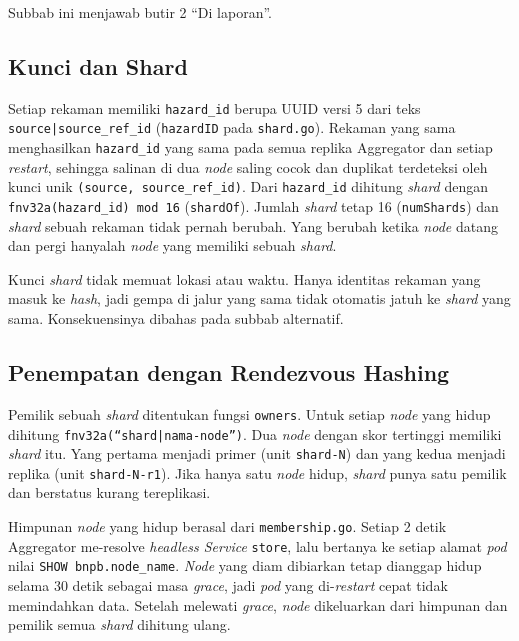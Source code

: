 Subbab ini menjawab butir 2 ``Di laporan''.

\subsection{Kunci dan Shard}

Setiap rekaman memiliki \texttt{hazard\_id} berupa UUID versi 5 dari teks \texttt{source|source\_ref\_id} (\texttt{hazardID} pada \texttt{shard.go}). Rekaman yang sama menghasilkan \texttt{hazard\_id} yang sama pada semua replika Aggregator dan setiap \textit{restart}, sehingga salinan di dua \textit{node} saling cocok dan duplikat terdeteksi oleh kunci unik \texttt{(source, source\_ref\_id)}. Dari \texttt{hazard\_id} dihitung \textit{shard} dengan \texttt{fnv32a(hazard\_id) mod 16} (\texttt{shardOf}). Jumlah \textit{shard} tetap 16 (\texttt{numShards}) dan \textit{shard} sebuah rekaman tidak pernah berubah. Yang berubah ketika \textit{node} datang dan pergi hanyalah \textit{node} yang memiliki sebuah \textit{shard}.

Kunci \textit{shard} tidak memuat lokasi atau waktu. Hanya identitas rekaman yang masuk ke \textit{hash}, jadi gempa di jalur yang sama tidak otomatis jatuh ke \textit{shard} yang sama. Konsekuensinya dibahas pada subbab alternatif.

\subsection{Penempatan dengan Rendezvous Hashing}

Pemilik sebuah \textit{shard} ditentukan fungsi \texttt{owners}. Untuk setiap \textit{node} yang hidup dihitung \texttt{fnv32a(``shard|nama-node'')}. Dua \textit{node} dengan skor tertinggi memiliki \textit{shard} itu. Yang pertama menjadi primer (unit \texttt{shard-N}) dan yang kedua menjadi replika (unit \texttt{shard-N-r1}). Jika hanya satu \textit{node} hidup, \textit{shard} punya satu pemilik dan berstatus kurang tereplikasi.

Himpunan \textit{node} yang hidup berasal dari \texttt{membership.go}. Setiap 2 detik Aggregator me-resolve \textit{headless Service} \texttt{store}, lalu bertanya ke setiap alamat \textit{pod} nilai \texttt{SHOW bnpb.node\_name}. \textit{Node} yang diam dibiarkan tetap dianggap hidup selama 30 detik sebagai masa \textit{grace}, jadi \textit{pod} yang di-\textit{restart} cepat tidak memindahkan data. Setelah melewati \textit{grace}, \textit{node} dikeluarkan dari himpunan dan pemilik semua \textit{shard} dihitung ulang.

